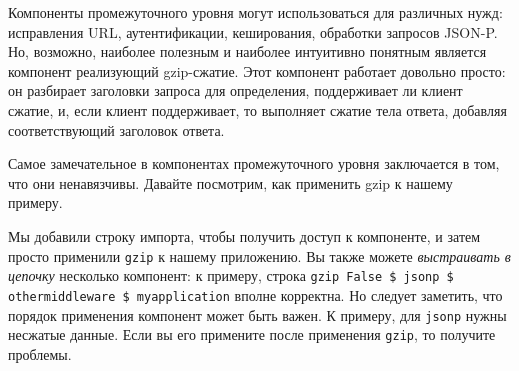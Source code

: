 Компоненты промежуточного уровня могут использоваться для различных нужд:
исправления URL, аутентификации, кеширования, обработки запросов JSON-P. Но,
возможно, наиболее полезным и наиболее интуитивно понятным является компонент
реализующий gzip-сжатие. Этот компонент работает довольно просто: он разбирает
заголовки запроса для определения, поддерживает ли клиент сжатие, и, если
клиент поддерживает, то выполняет сжатие тела ответа, добавляя соответствующий
заголовок ответа.

Самое замечательное в компонентах промежуточного уровня заключается в том, что
они ненавязчивы. Давайте посмотрим, как применить gzip к нашему примеру.


Мы добавили строку импорта, чтобы получить доступ к компоненте, и затем просто
применили \lstinline!gzip!  к нашему приложению. Вы также можете
\emph{выстраивать в цепочку} несколько компонент: к примеру, строка
\lstinline'gzip False $ jsonp $ othermiddleware $ myapplication' вполне
корректна. Но следует заметить, что порядок применения компонент может быть
важен. К примеру, для \lstinline!jsonp! нужны несжатые данные. Если вы его
примените после применения \lstinline!gzip!, то получите проблемы.
